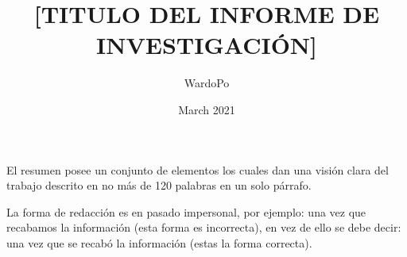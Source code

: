 \documentclass[12]{plan_tesis}
\title{[TITULO DEL  INFORME DE INVESTIGACIÓN]}
\author{WardoPo}
\date{March 2021}
\begin{document}


\begin{resumen}
El resumen posee un conjunto de elementos los cuales dan una visión clara del trabajo descrito en no más de 120 palabras en un solo párrafo.  

La forma de redacción es en pasado impersonal, por ejemplo: una vez que recabamos la información (esta forma es incorrecta), en vez de ello se debe decir: una vez que se recabó la información (estas la forma correcta).  
\end{resumen}










\end{document}
